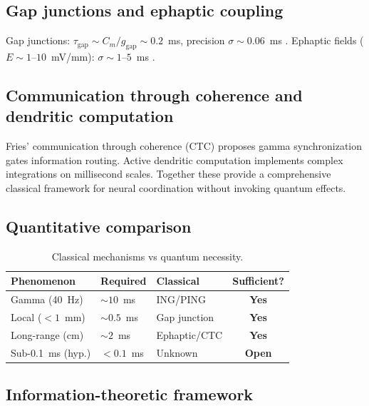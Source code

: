 \documentclass[twocolumn,10pt]{article}
\begin{document}
\subsection{Gap junctions and ephaptic coupling}

Gap junctions: $\tau_{\text{gap}} \sim C_m/g_{\text{gap}} \sim 0.2$~ms,
precision $\sigma \sim 0.06$~ms \cite{Galarreta1999,Bennett2004}. Ephaptic
fields ($E \sim 1\text{--}10$~mV/mm): $\sigma \sim 1\text{--}5$~ms
\cite{Anastassiou2011,Frohlich2010}.


\subsection{Communication through coherence and dendritic computation}

Fries' communication through coherence (CTC) \cite{Fries2015} proposes
gamma synchronization gates information routing. Active dendritic
computation \cite{Poirazi2020} implements complex integrations on
millisecond scales. Together these provide a comprehensive classical
framework for neural coordination without invoking quantum effects.


\subsection{Quantitative comparison}

\begin{table}[h]
\centering
\caption{Classical mechanisms vs quantum necessity.}
\label{tab:classical_quantum}
\small
\begin{tabular}{p{2.8cm}p{1.8cm}p{2.2cm}c}
\toprule
\textbf{Phenomenon} & \textbf{Required} & \textbf{Classical} &
\textbf{Sufficient?} \\
\midrule
Gamma (40~Hz) & $\sim 10$~ms & ING/PING & \textbf{Yes} \\
Local ($<1$~mm) & $\sim 0.5$~ms & Gap junction & \textbf{Yes} \\
Long-range (cm) & $\sim 2$~ms & Ephaptic/CTC & \textbf{Yes} \\
Sub-0.1~ms (hyp.) & $< 0.1$~ms & Unknown & \textbf{Open} \\
\bottomrule
\end{tabular}
\end{table}


\subsection{Information-theoretic framework}
\end{document}
